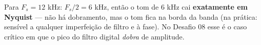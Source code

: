 Para $F_s=12$ kHz: $F_s/2=6$ kHz, então o tom de $6$ kHz cai
\textbf{exatamente em Nyquist} — não há dobramento, mas o tom fica na borda da
banda (na prática: sensível a qualquer imperfeição de filtro e à fase). No
Desafio 08 esse é o caso crítico em que o pico do filtro digital
\emph{dobra} de amplitude.

